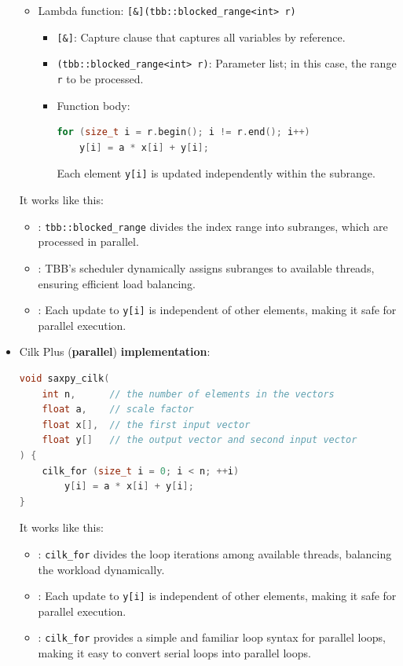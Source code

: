 \begin{itemize}
\begin{itemize}
        \item Lambda function: \texttt{[\&](tbb::blocked\_range<int> r)}
        \begin{itemize}
            \item \texttt{[\&]}: Capture clause that captures all variables by reference.
            \item \texttt{(tbb::blocked\_range<int> r)}: Parameter list; in this case, the range \texttt{r} to be processed.
            \item Function body:
            \begin{lstlisting}[language=c]
for (size_t i = r.begin(); i != r.end(); i++)
    y[i] = a * x[i] + y[i];\end{lstlisting}
            Each element \texttt{y[i]} is updated independently within the subrange.
        \end{itemize}
    \end{itemize}
    It works like this:
    \begin{itemize}
        \item {}: \texttt{tbb::blocked\_range} divides the index range into subranges, which are processed in parallel.
        \item {}: TBB's scheduler dynamically assigns subranges to available threads, ensuring efficient load balancing.
        \item {}: Each update to \texttt{y[i]} is independent of other elements, making it safe for parallel execution.
    \end{itemize}

    \item Cilk Plus (\textbf{parallel}) \textbf{implementation}:
    \begin{lstlisting}[language=c]
void saxpy_cilk(
    int n,      // the number of elements in the vectors
    float a,    // scale factor
    float x[],  // the first input vector
    float y[]   // the output vector and second input vector
) {
    cilk_for (size_t i = 0; i < n; ++i)
        y[i] = a * x[i] + y[i];
}\end{lstlisting}
    It works like this:
    \begin{itemize}
        \item {}: \texttt{cilk\_for} divides the loop iterations among available threads, balancing the workload dynamically.
        \item {}: Each update to \texttt{y[i]} is independent of other elements, making it safe for parallel execution.
        \item {}: \texttt{cilk\_for} provides a simple and familiar loop syntax for parallel loops, making it easy to convert serial loops into parallel loops.
    \end{itemize}


\end{itemize}
